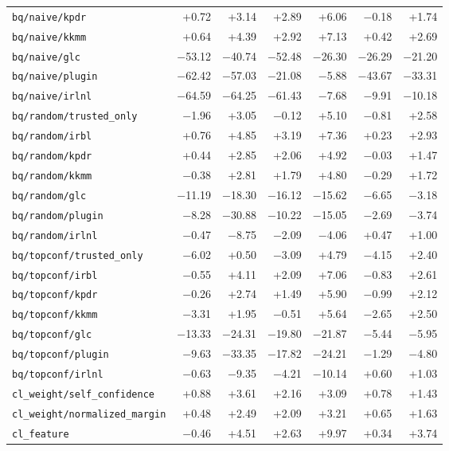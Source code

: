 \begin{tabular}{lrrrrrr}
\texttt{bq/naive/kpdr} & +0.72 & +3.14 & +2.89 & +6.06 & $-$0.18 & +1.74 \\
\texttt{bq/naive/kkmm} & +0.64 & +4.39 & +2.92 & +7.13 & +0.42 & +2.69 \\
\texttt{bq/naive/glc} & $-$53.12 & $-$40.74 & $-$52.48 & $-$26.30 & $-$26.29 & $-$21.20 \\
\texttt{bq/naive/plugin} & $-$62.42 & $-$57.03 & $-$21.08 & $-$5.88 & $-$43.67 & $-$33.31 \\
\texttt{bq/naive/irlnl} & $-$64.59 & $-$64.25 & $-$61.43 & $-$7.68 & $-$9.91 & $-$10.18 \\
\texttt{bq/random/trusted\_only} & $-$1.96 & +3.05 & $-$0.12 & +5.10 & $-$0.81 & +2.58 \\
\texttt{bq/random/irbl} & +0.76 & +4.85 & +3.19 & +7.36 & +0.23 & +2.93 \\
\texttt{bq/random/kpdr} & +0.44 & +2.85 & +2.06 & +4.92 & $-$0.03 & +1.47 \\
\texttt{bq/random/kkmm} & $-$0.38 & +2.81 & +1.79 & +4.80 & $-$0.29 & +1.72 \\
\texttt{bq/random/glc} & $-$11.19 & $-$18.30 & $-$16.12 & $-$15.62 & $-$6.65 & $-$3.18 \\
\texttt{bq/random/plugin} & $-$8.28 & $-$30.88 & $-$10.22 & $-$15.05 & $-$2.69 & $-$3.74 \\
\texttt{bq/random/irlnl} & $-$0.47 & $-$8.75 & $-$2.09 & $-$4.06 & +0.47 & +1.00 \\
\texttt{bq/topconf/trusted\_only} & $-$6.02 & +0.50 & $-$3.09 & +4.79 & $-$4.15 & +2.40 \\
\texttt{bq/topconf/irbl} & $-$0.55 & +4.11 & +2.09 & +7.06 & $-$0.83 & +2.61 \\
\texttt{bq/topconf/kpdr} & $-$0.26 & +2.74 & +1.49 & +5.90 & $-$0.99 & +2.12 \\
\texttt{bq/topconf/kkmm} & $-$3.31 & +1.95 & $-$0.51 & +5.64 & $-$2.65 & +2.50 \\
\texttt{bq/topconf/glc} & $-$13.33 & $-$24.31 & $-$19.80 & $-$21.87 & $-$5.44 & $-$5.95 \\
\texttt{bq/topconf/plugin} & $-$9.63 & $-$33.35 & $-$17.82 & $-$24.21 & $-$1.29 & $-$4.80 \\
\texttt{bq/topconf/irlnl} & $-$0.63 & $-$9.35 & $-$4.21 & $-$10.14 & +0.60 & +1.03 \\
\texttt{cl\_weight/self\_confidence} & +0.88 & +3.61 & +2.16 & +3.09 & +0.78 & +1.43 \\
\texttt{cl\_weight/normalized\_margin} & +0.48 & +2.49 & +2.09 & +3.21 & +0.65 & +1.63 \\
\texttt{cl\_feature} & $-$0.46 & +4.51 & +2.63 & +9.97 & +0.34 & +3.74 \\
\bottomrule
\end{tabular}
